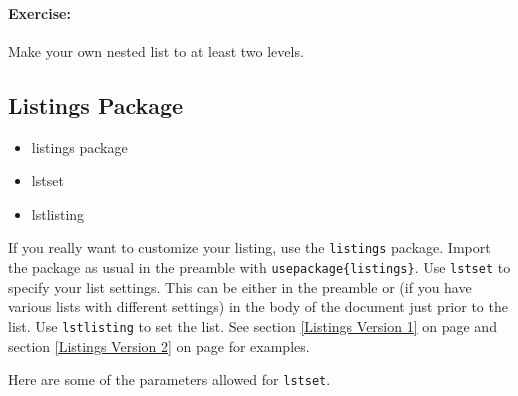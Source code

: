         \paragraph{Exercise:} Make your own nested list to at least two levels.

        \subsection{Listings Package}
        \label{Listings Package}
        
        \begin{framed}
            \begin{itemize}
                \item{listings package}
                \item{lstset}
                \item{lstlisting}
            \end{itemize}
        \end{framed}

        If you really want to customize your listing, use the \texttt{listings} package. Import the package as usual in the preamble with \texttt{usepackage\{listings\}}. Use \texttt{lstset} to specify your list settings. This can be either in the preamble or (if you have various lists with different settings) in the body of the document just prior to the list. Use \texttt{lstlisting} to set the list. See section \ref{Listings Version 1} on page \pageref{Listings Version 1} and section \ref{Listings Version 2} on page \pageref{Listings Version 2} for examples.

        Here are some of the parameters allowed for \texttt{lstset}.


